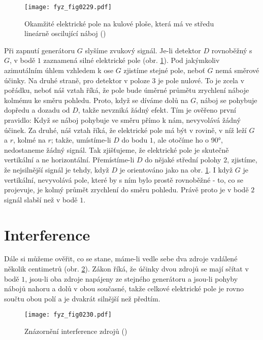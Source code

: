     \begin{figure}[ht!] %
      \centering
      \texttt{[image: fyz\_fig0229.pdf]}
      \caption{Okamžité elektrické pole na kulové ploše, která má ve středu lineárně oscilující 
               náboj (\cite[s.~376]{Feynman01})}
      \label{fyz:fig0229}
    \end{figure}

    Při zapnutí generátoru \(G\) slyšíme zvukový signál. Je-li detektor \(D\) rovnoběžný s \(G\), v 
    bodě \(1\) zaznamená silné elektrické pole (obr. \ref{fyz:fig0229}). Pod jakýmkoliv azimutálním 
    úhlem vzhledem k ose \(G\) zjistíme stejné pole, neboť \(G\) nemá směrové účinky. Na druhé 
    straně, pro detektor v poloze \(3\) je pole nulové. To je zcela v pořádku, neboť náš vztah 
    říká, že pole bude úměrné průmětu zrychlení náboje kolmému ke směru pohledu. Proto, když se 
    díváme dolů na \(G\), náboj se pohybuje dopředu a dozadu od \(D\), takže nevzniká žádný efekt. 
    Tím je ověřeno první pravidlo: Když se náboj pohybuje ve směru přímo k nám, nevyvolává žádný 
    účinek. Za druhé, náš vztah říká, že elektrické pole má být v rovině, v níž leží \(G\) a \(r\), 
    kolmé na \(r\); takže, umístíme-li \(D\) do bodu \(1\), ale otočíme ho o \ang{90}, nedostaneme 
    žádný signál. Tak zjišťujeme, že elektrické pole je skutečně vertikální a ne horizontální. 
    Přemístíme-li \(D\) do nějaké střední polohy \(2\), zjistíme, že nejsilnější signál je tehdy, 
    když \(D\) je orientováno jako na obr. \ref{fyz:fig0229}. I když \(G\) je vertikální,
    nevyvolává pole, které by s ním bylo prostě rovnoběžné - to, co se projevuje, je kolmý průmět 
    zrychlení do směru pohledu. Právě proto je v bodě \(2\) signál slabší než v bodě \(1\).
    
  \section{Interference}\label{fyz:IchapXXVIIIsecIV}
    Dále si můžeme ověřit, co se stane, máme-li vedle sebe dva zdroje vzdálené několik centimetrů 
    (obr. \ref{fyz:fig0230}). Zákon říká, že účinky dvou zdrojů se mají sčítat v bodě \(1\), jsou-li 
    oba zdroje napájeny ze stejného generátoru a jsou-li pohyby nábojů nahoru a dolů v obou 
    současné, takže celkové elektrické pole je rovno součtu obou polí a je dvakrát silnější než 
    předtím.
    
    \begin{figure}[ht!] %
      \centering
      \texttt{[image: fyz\_fig0230.pdf]}
      \caption{Znázornění interference zdrojů
               (\cite[s.~377]{Feynman01})}
      \label{fyz:fig0230}
    \end{figure}
    
